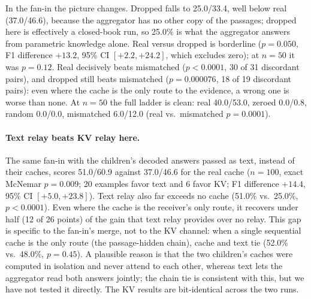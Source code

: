 \documentclass[11pt]{article}
\begin{document}
In the fan-in the picture changes. Dropped falls to 25.0/33.4, well below
real (37.0/46.6), because the aggregator has no other copy of the passages;
dropped here is effectively a closed-book run, so 25.0\% is what the aggregator
answers from parametric knowledge alone. Real versus dropped is borderline ($p=0.050$, F1 difference
$+13.2$, 95\% CI $[+2.2,+24.2]$, which excludes zero); at $n{=}50$ it was
$p=0.12$. Real decisively beats mismatched ($p<0.0001$, 30 of 31
discordant pairs), and dropped still beats mismatched ($p=0.000076$, 18
of 19 discordant pairs): even where the cache is the only route to the
evidence, a wrong one is worse than none. At $n{=}50$ the full ladder is
clean: real 40.0/53.0, zeroed 0.0/0.8, random 0.0/0.0, mismatched
6.0/12.0 (real vs.\ mismatched $p=0.0001$).

\paragraph{Text relay beats KV relay here.} The same fan-in with the children's
decoded answers passed as text, instead of their caches, scores 51.0/60.9 against
37.0/46.6 for the real cache ($n{=}100$, exact McNemar $p=0.009$; 20 examples
favor text and 6 favor KV; F1 difference $+14.4$, 95\% CI $[+5.0,+23.8]$). Text
relay also far exceeds no cache (51.0\% vs.\ 25.0\%, $p<0.0001$). Even where
the cache is the receiver's only route, it recovers under half (12 of 26 points) of
the gain that text relay provides over no relay. This gap is specific to
the fan-in's merge, not to the KV channel: when a single sequential cache is the
only route (the passage-hidden chain), cache and text tie (52.0\% vs.\ 48.0\%,
$p=0.45$). A plausible reason is that the two children's caches were computed in
isolation and never attend to each other, whereas text lets the aggregator read both
answers jointly; the chain tie is consistent with this, but we have not tested it
directly. The KV results are bit-identical across the two runs.
\end{document}
